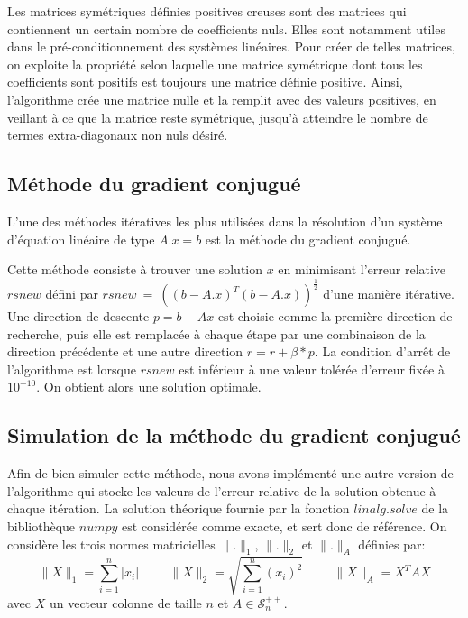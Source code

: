 \documentclass[a4paper]{article}
\begin{document}
Les matrices symétriques définies positives creuses sont des matrices qui contiennent un certain nombre de coefficients nuls. Elles sont notamment utiles dans le pré-conditionnement des systèmes linéaires. Pour créer de telles matrices, on exploite la propriété selon laquelle une matrice symétrique dont tous les coefficients sont positifs est toujours une matrice définie positive. Ainsi, l'algorithme crée une matrice nulle et la remplit avec des valeurs positives, en veillant à ce que la matrice reste symétrique, jusqu'à atteindre le nombre de termes extra-diagonaux non nuls désiré.


\subsection{Méthode du gradient conjugué}

L'une des méthodes itératives les plus utilisées dans la résolution d'un système d'équation linéaire de type $A.x = b$ est la méthode du gradient conjugué.


Cette méthode consiste à trouver une solution $x$ en minimisant l'erreur relative 
$rsnew$ défini par $rsnew~=~((b-A.x)^{T}(b-A.x))^{\frac{1}{2}}$ d'une manière itérative. Une direction de descente $p=b-Ax$ est choisie comme la première direction de recherche, puis elle est remplacée à chaque étape par une combinaison de la direction précédente et une autre direction $r=r+\beta*p$. La condition d'arrêt de l'algorithme est lorsque $rsnew$ est inférieur à une valeur tolérée d'erreur fixée à $10^{-10}$. On obtient alors une solution optimale.


\subsection{Simulation de la méthode du gradient conjugué}

Afin de bien simuler cette méthode, nous avons implémenté une autre version de l'algorithme qui stocke les valeurs de l'erreur relative de la solution obtenue à chaque itération. La solution théorique fournie par la fonction $linalg.solve$ de la bibliothèque $numpy$ est considérée comme exacte, et sert donc de référence. On considère les trois normes matricielles $\| . \|_{1}$, $\| . \|_{2}$ et $\| . \|_{A}$ définies par:
\[ \| X \|_{1} = \sum_{i=1}^{n} |x_{i}| \hspace{1cm}  \| X \|_{2} = \sqrt{\sum_{i=1}^{n} (x_{i})^{2}} \hspace{1cm}  \| X \|_{A} =  X^{T}AX\]
avec $X$ un vecteur colonne de taille $n$ et $A \in \mathcal{S}_{n}^{++}$.
\end{document}
